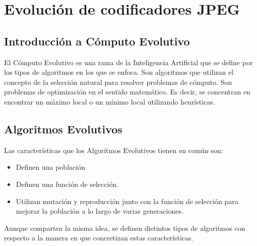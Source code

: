 
\chapter{Evolución de codificadores JPEG}\label{ch:resultados_evolucion}

\section{Introducción a Cómputo Evolutivo}

El \gls{Cómputo Evolutivo} es una rama de la Inteligencia Artificial que se define
por los tipos de algoritmos en los que se enfoca. Son algoritmos que utilizan
el concepto de la selección natural para resolver problemas de cómputo. Son
problemas de optimización en el sentido matemático. Es decir, se concentran en
encontrar un máximo local o un mínimo local utilizando heurísticas.


\section{Algoritmos Evolutivos}

Las características que los Algoritmos Evolutivos tienen en común son:

\begin{itemize}
\item Definen una población
\item Definen una función de selección.
\item Utilizan mutación y reproducción junto con la función de selección para
mejorar la población a lo largo de varias generaciones.
\end{itemize}

Aunque comparten la misma idea, se definen distintos tipos de algoritmos con
respecto a la manera en que concretizan estas características.

